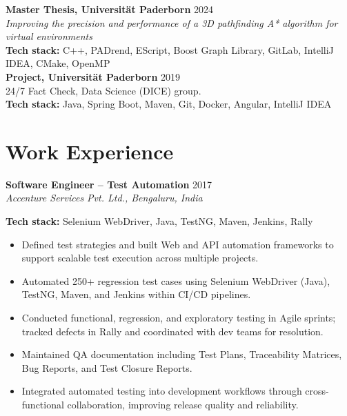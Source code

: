 \documentclass[10pt]{article}   %
\begin{document}
\begin{minipage}[t]{0.67\textwidth}
\textbf{Master Thesis, Universität Paderborn} \hfill 2024 \\
\textit{Improving the precision and performance of a 3D pathfinding A* algorithm
for virtual environments} \\
\textbf{Tech stack:} C++, PADrend, EScript, Boost Graph Library, GitLab, IntelliJ IDEA, CMake, OpenMP\\
\linebreak
\textbf{Project, Universität Paderborn} \hfill 2019 \\
 24/7 Fact Check, Data Science (DICE) group. \\
\textbf{Tech stack:} Java, Spring Boot, Maven, Git, Docker, Angular, IntelliJ IDEA

\section*{Work Experience}
\textbf{Software Engineer – Test Automation} \hfill 2017\\
\textit{Accenture Services Pvt. Ltd., Bengaluru, India} 


\textbf{Tech stack:} Selenium WebDriver, Java, TestNG, Maven, Jenkins, Rally
\begin{itemize}[leftmargin=*, topsep=2pt, itemsep=1pt, parsep=0pt]
\item Defined test strategies and built Web and API automation frameworks to support scalable test execution across multiple projects.
\item Automated 250+ regression test cases using Selenium WebDriver (Java), TestNG, Maven, and Jenkins within CI/CD pipelines.
\item Conducted functional, regression, and exploratory testing in Agile sprints; tracked defects in Rally and coordinated with dev teams for resolution.
\item Maintained QA documentation including Test Plans, Traceability Matrices, Bug Reports, and Test Closure Reports.
\item Integrated automated testing into development workflows through cross-functional collaboration, improving release quality and reliability.
\end{itemize}

\end{minipage}
\end{document}
